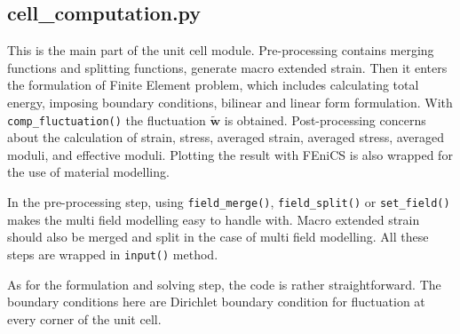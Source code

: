 \documentclass[10pt,a4paper]{scrreprt}
\begin{document}
\subsection{cell\_computation.py}
This is the main part of the unit cell module. Pre-processing contains merging functions and splitting functions, generate macro extended strain. Then it enters the formulation of Finite Element problem, which includes calculating total energy, imposing boundary conditions, bilinear and linear form formulation. With \texttt{comp\_fluctuation()} the fluctuation $\widetilde{\mathbf{w}}$ is obtained. Post-processing concerns about the calculation of strain, stress, averaged strain, averaged stress, averaged moduli, and effective moduli. Plotting the result with FEniCS is also wrapped for the use of material modelling.

In the pre-processing step, using \texttt{field\_merge()}, \texttt{field\_split()} or \texttt{set\_field()} makes the multi field modelling easy to handle with. Macro extended strain should also be merged and split in the case of multi field modelling. All these steps are wrapped in \texttt{input()} method.

As for the formulation and solving step, the code is rather straightforward. The boundary conditions here are Dirichlet boundary condition for fluctuation at every corner of the unit cell.
\end{document}
